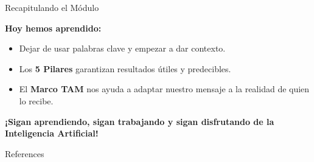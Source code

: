 \documentclass[aspectratio=169]{beamer}
\begin{document}
\begin{frame}[fragile]{Recapitulando el Módulo}


\textbf{Hoy hemos aprendido:}
\begin{itemize}
  \item Dejar de usar palabras clave y empezar a dar contexto.
  \item Los \textbf{5 Pilares} garantizan resultados útiles y predecibles.
  \item El \textbf{Marco TAM} nos ayuda a adaptar nuestro mensaje a la realidad de quien lo recibe.
\end{itemize}
\textbf{¡Sigan aprendiendo, sigan trabajando y sigan disfrutando de la Inteligencia Artificial!}
\end{frame}




\begin{frame}[allowframebreaks]{References}
  
  
\end{frame}
\end{document}

